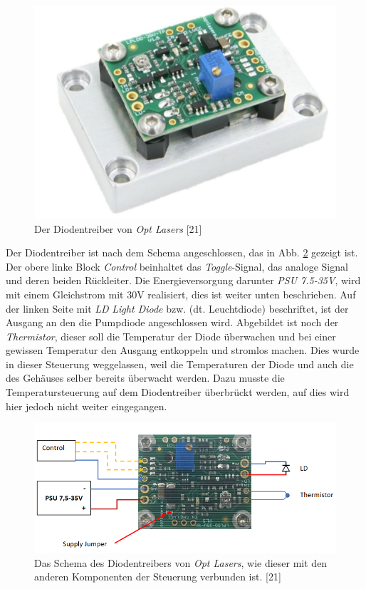 \begin{figure}[H]
    \centering
    \includegraphics[scale=0.75]{98_images/ldd_optlaser.jpg}
    \caption{Der Diodentreiber von \textit{Opt Lasers} [21]}
    \label{fig:_diodentreiber_hw}
\end{figure}

Der Diodentreiber ist nach dem Schema angeschlossen, das in Abb. \ref{fig:diodentreiber_schema_hw} gezeigt ist. Der obere linke Block \textit{Control} beinhaltet das \textit{Toggle}-Signal, das analoge Signal und deren beiden Rückleiter. Die Energieversorgung darunter \textit{PSU 7.5-35V}, wird mit einem Gleichstrom mit 30V realisiert, dies ist weiter unten beschrieben. Auf der linken Seite mit \textit{LD} \textit{Light Diode}  bzw.  (dt. Leuchtdiode) beschriftet, ist der Ausgang an den die Pumpdiode angeschlossen wird. Abgebildet ist noch der \textit{Thermistor}, dieser soll die Temperatur der Diode überwachen und bei einer gewissen Temperatur den Ausgang entkoppeln und stromlos machen. Dies wurde in dieser Steuerung weggelassen, weil die Temperaturen der Diode und auch die des Gehäuses selber bereits überwacht werden. Dazu musste die Temperatursteuerung auf dem Diodentreiber überbrückt werden, auf dies wird hier jedoch nicht weiter eingegangen.

\begin{figure}[H]
    \centering
    \includegraphics[scale=0.6, trim={0mm 0mm 0mm 0mm}, clip]{98_images/ldd_schema_connections.PNG}
    \caption{Das Schema des Diodentreibers von \textit{Opt Lasers}, wie dieser mit den anderen Komponenten der Steuerung verbunden ist. [21]}
    \label{fig:diodentreiber_schema_hw}
\end{figure}

